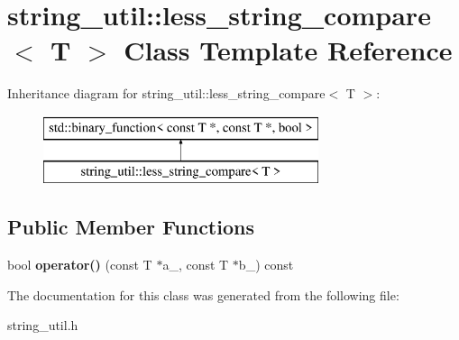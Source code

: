 \hypertarget{classstring__util_1_1less__string__compare}{\section{string\+\_\+util\+:\+:less\+\_\+string\+\_\+compare$<$ T $>$ Class Template Reference}
\label{classstring__util_1_1less__string__compare}
}
Inheritance diagram for string\+\_\+util\+:\+:less\+\_\+string\+\_\+compare$<$ T $>$\+:\begin{figure}[H]
\begin{center}
\leavevmode
\includegraphics[height=2.000000cm]{classstring__util_1_1less__string__compare}
\end{center}
\end{figure}
\subsection*{Public Member Functions}
\begin{DoxyCompactItemize}
\item 
\hypertarget{classstring__util_1_1less__string__compare_aa97df82edd8f7e33e5715acf71759337}{bool {\bfseries operator()} (const T $\ast$a\+\_\+, const T $\ast$b\+\_\+) const }\label{classstring__util_1_1less__string__compare_aa97df82edd8f7e33e5715acf71759337}

\end{DoxyCompactItemize}


The documentation for this class was generated from the following file\+:\begin{DoxyCompactItemize}
\item 
string\+\_\+util.\+h\end{DoxyCompactItemize}
